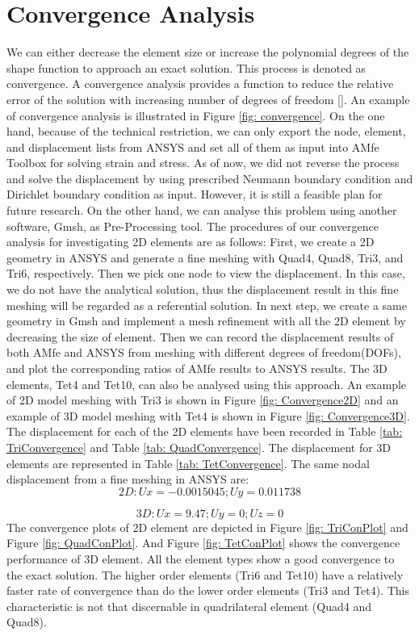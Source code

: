 \section{Convergence Analysis}
We can either decrease the element size or increase the polynomial degrees of the shape function to approach an exact solution. This process is denoted as convergence. A convergence analysis provides a function to reduce the relative error of the solution with increasing number of degrees of freedom [\cite{FiniteElement}]. An example of convergence analysis is illustrated in Figure \ref{fig: convergence}. On the one hand, because of the technical restriction, we can only export the node, element, and displacement lists from ANSYS and set all of them as input into AMfe Toolbox for solving strain and stress. As of now, we did not reverse the process and solve the displacement by using prescribed Neumann boundary condition and Dirichlet boundary condition as input. However, it is still a feasible plan for future research. On the other hand, we can analyse this problem using another software, Gmsh, as Pre-Processing tool. The procedures of our convergence analysis for investigating 2D elements are as follows: First, we create a 2D geometry in ANSYS and generate a fine meshing with Quad4, Quad8, Tri3, and Tri6, respectively. Then we pick one node to view the displacement. In this case, we do not have the analytical solution, thus the displacement result in this fine meshing will be regarded as a referential solution. In next step, we create a same geometry in Gmsh and implement a mesh refinement with all the 2D element by decreasing the size of element. Then we can record the displacement results of both AMfe and ANSYS from meshing with different degrees of freedom(DOFs), and plot the corresponding ratios of AMfe results to ANSYS results. The 3D elements, Tet4 and Tet10, can also be analysed using this approach. An example of 2D model meshing with Tri3 is shown in Figure \ref{fig: Convergence2D} and an example of 3D model meshing with Tet4 is shown in Figure \ref{fig: Convergence3D}.
The displacement for each of the 2D elements have been recorded in Table \ref{tab: TriConvergence} and Table \ref{tab: QuadConvergence}. The displacement for 3D elements are represented in Table \ref{tab: TetConvergence}. The same nodal displacement from a fine meshing in ANSYS are:
\begin{equation*}
2D: Ux = -0.0015045; Uy = 0.011738
\end{equation*}

\begin{equation*}
3D: Ux = 9.47; Uy = 0; Uz = 0
\end{equation*}
The convergence plots of 2D element are depicted in Figure \ref{fig: TriConPlot} and Figure \ref{fig: QuadConPlot}. And Figure \ref{fig: TetConPlot} shows the convergence performance of 3D element. All the element types show a good convergence to the exact solution. The higher order elements (Tri6 and Tet10) have a relatively faster rate of convergence than do the lower order elements (Tri3 and Tet4). This characteristic is not that discernable in quadrilateral element (Quad4 and Quad8). 

